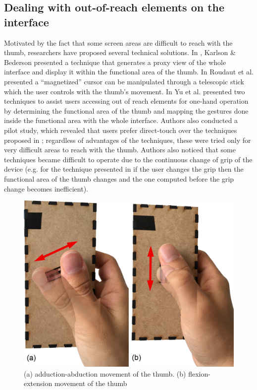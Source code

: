 \documentclass{sigchi}
\begin{document}
\subsection{Dealing with out-of-reach elements on the interface}
Motivated by the fact that some screen areas are difficult to reach with the thumb, researchers have proposed several technical solutions. In \cite{Karlson:2007:TGO:1776994.1777034}, Karlson \& Bederson presented a technique that generates a proxy view of the whole interface and display it within the functional area of the thumb. In \cite{Roudaut:2008:TMI:1385569.1385594} Roudaut et al. presented a “magnetized” cursor can be manipulated through a telescopic stick which the user controls with the thumb’s movement. In \cite{Yu:2013:RSH:2493190.2493202} Yu et al. presented two techniques to assist users accessing out of reach elements for one-hand operation by determining the functional area of the thumb and mapping the gestures done inside the functional area with the whole interface. Authors also conducted a pilot study, which revealed that users prefer direct-touch over the techniques proposed in \cite{Karlson:2007:TGO:1776994.1777034,Roudaut:2008:TMI:1385569.1385594}; regardless of advantages of the techniques, these were tried only for very difficult areas to reach with the thumb. Authors also noticed that some techniques became difficult to operate due to the continuous change of grip of the device (e.g. for the technique presented in \cite{Karlson:2007:TGO:1776994.1777034} if the user changes the grip then the functional area of the thumb changes and the one computed before the grip change becomes inefficient).

\begin{figure}[h]
\centering
  \includegraphics[width=1\columnwidth]{figures/thumbMove}
  \caption{(a) adduction-abduction movement of the thumb. (b) flexion-extension movement of the thumb}
  \label{fig:figure6}
\end{figure}
\end{document}
